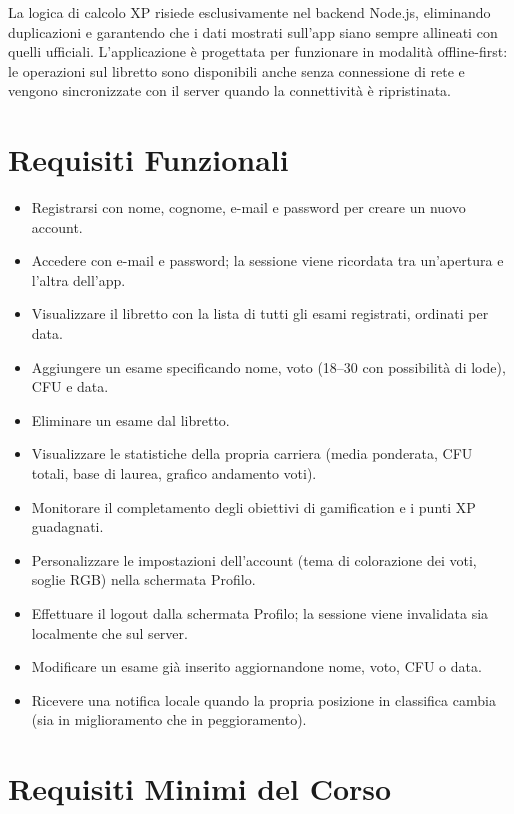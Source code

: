 \documentclass[a4paper,12pt]{report}
\begin{document}
    La logica di calcolo XP risiede esclusivamente nel backend Node.js, eliminando
    duplicazioni e garantendo che i dati mostrati sull'app siano sempre allineati
    con quelli ufficiali. L'applicazione è progettata per funzionare in modalità
    offline-first: le operazioni sul libretto sono disponibili anche senza connessione
    di rete e vengono sincronizzate con il server quando la connettività è ripristinata.

    \section{Requisiti Funzionali}
    \begin{itemize}
        \item Registrarsi con nome, cognome, e-mail e password per creare un nuovo account.
        \item Accedere con e-mail e password; la sessione viene ricordata tra un'apertura e l'altra dell'app.
        \item Visualizzare il libretto con la lista di tutti gli esami registrati, ordinati per data.
        \item Aggiungere un esame specificando nome, voto (18--30 con possibilità di lode), CFU e data.
        \item Eliminare un esame dal libretto.
        \item Visualizzare le statistiche della propria carriera (media ponderata, CFU totali, base di laurea, grafico andamento voti).
        \item Monitorare il completamento degli obiettivi di gamification e i punti XP guadagnati.
        \item Personalizzare le impostazioni dell'account (tema di colorazione dei voti, soglie RGB) nella schermata Profilo.
        \item Effettuare il logout dalla schermata Profilo; la sessione viene invalidata sia localmente che sul server.
        \item Modificare un esame già inserito aggiornandone nome, voto, CFU o data.
        \item Ricevere una notifica locale quando la propria posizione in classifica cambia (sia in miglioramento che in peggioramento).
    \end{itemize}

    \section{Requisiti Minimi del Corso}
\end{document}
